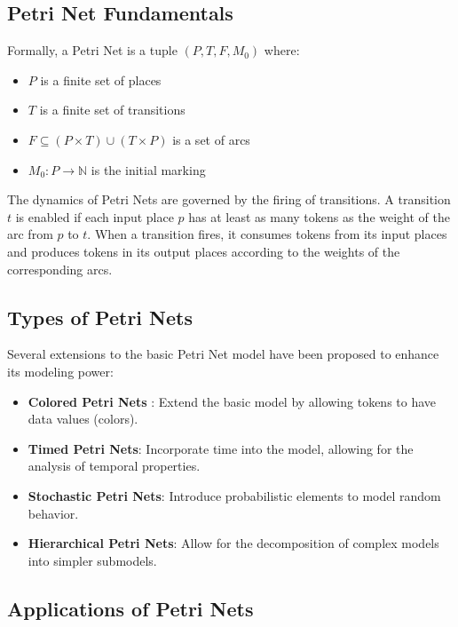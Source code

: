 \label{sec:background}

\subsection{Petri Net Fundamentals}

Formally, a Petri Net is a tuple $(P, T, F, M_0)$ where:
\begin{itemize}
    \item $P$ is a finite set of places
    \item $T$ is a finite set of transitions
    \item $F \subseteq (P \times T) \cup (T \times P)$ is a set of arcs
    \item $M_0: P \rightarrow \mathbb{N}$ is the initial marking
\end{itemize}

The dynamics of Petri Nets are governed by the firing of transitions. A transition $t$ is enabled if each input place $p$ has at least as many tokens as the weight of the arc from $p$ to $t$. When a transition fires, it consumes tokens from its input places and produces tokens in its output places according to the weights of the corresponding arcs.

\subsection{Types of Petri Nets}

Several extensions to the basic Petri Net model have been proposed to enhance its modeling power:

\begin{itemize}
    \item \textbf{Colored Petri Nets} \cite{jensen1987coloured}: Extend the basic model by allowing tokens to have data values (colors).
    \item \textbf{Timed Petri Nets}: Incorporate time into the model, allowing for the analysis of temporal properties.
    \item \textbf{Stochastic Petri Nets}: Introduce probabilistic elements to model random behavior.
    \item \textbf{Hierarchical Petri Nets}: Allow for the decomposition of complex models into simpler submodels.
\end{itemize}

\subsection{Applications of Petri Nets}

